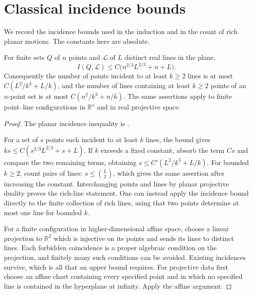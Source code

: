 \section{Classical incidence bounds}\label{sec:classical-incidence}

We record the incidence bounds used in the induction and in the count of rich planar motions. The constants here are absolute.

\begin{theorem}\label{thm:ci-st}
For finite sets $Q$ of $n$ points and $\mathcal{L}$ of $L$ distinct real lines in the plane,
\[
 I(Q,\mathcal{L})\le C\bigl(n^{2/3}L^{2/3}+n+L\bigr).
\]
Consequently the number of points incident to at least $k\ge2$ lines is at most $C(L^2/k^3+L/k)$, and the number of lines containing at least $k\ge2$ points of an $n$-point set is at most $C(n^2/k^3+n/k)$. The same assertions apply to finite point--line configurations in $\mathbb{R}^s$ and in real projective space.
\end{theorem}

\begin{proof}
The planar incidence inequality is \cite[Theorem~1]{szemereditrotter1983}.

For a set of $s$ points each incident to at least $k$ lines, the bound gives $ks\le C(s^{2/3}L^{2/3}+s+L)$.  If $k$ exceeds a fixed constant, absorb the term $Cs$ and compare the two remaining terms, obtaining $s\le C'(L^2/k^3+L/k)$.  For bounded $k\ge2$, count pairs of lines: $s\le\binom L2$, which gives the same assertion after increasing the constant.  Interchanging points and lines by planar projective duality proves the rich-line statement.  One can instead apply the incidence bound directly to the finite collection of rich lines, using that two points determine at most one line for bounded $k$.

For a finite configuration in higher-dimensional affine space, choose a linear projection to $\mathbb{R}^2$ which is injective on its points and sends its lines to distinct lines.  Each forbidden coincidence is a proper algebraic condition on the projection, and finitely many such conditions can be avoided.  Existing incidences survive, which is all that an upper bound requires.  For projective data first choose an affine chart containing every specified point and in which no specified line is contained in the hyperplane at infinity.  Apply the affine argument.
\end{proof}

